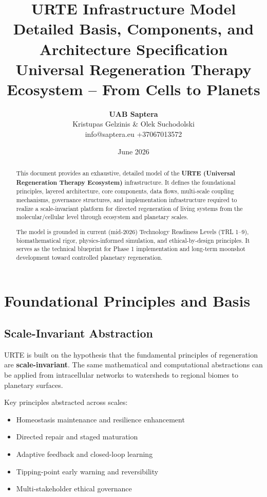 \documentclass[11pt,a4paper]{report}
\title{\textbf{URTE Infrastructure Model}\\[0.3cm]
\large Detailed Basis, Components, and Architecture Specification\\[0.2cm]
\normalsize Universal Regeneration Therapy Ecosystem -- From Cells to Planets}
\author{
\textbf{UAB Saptera} \\
Kristupas Gelzinis \& Olek Suchodolski \\
info@saptera.eu \quad +37067013572
}
\date{June 2026}
\begin{document}
\maketitle

\begin{abstract}
\noindent This document provides an exhaustive, detailed model of the \textbf{URTE (Universal Regeneration Therapy Ecosystem)} infrastructure. It defines the foundational principles, layered architecture, core components, data flows, multi-scale coupling mechanisms, governance structures, and implementation infrastructure required to realize a scale-invariant platform for directed regeneration of living systems from the molecular/cellular level through ecosystem and planetary scales.

The model is grounded in current (mid-2026) Technology Readiness Levels (TRL 1--9), biomathematical rigor, physics-informed simulation, and ethical-by-design principles. It serves as the technical blueprint for Phase 1 implementation and long-term moonshot development toward controlled planetary regeneration.
\end{abstract}

\tableofcontents
\newpage

\chapter{Foundational Principles and Basis}

\section{Scale-Invariant Abstraction}

URTE is built on the hypothesis that the fundamental principles of regeneration are \textbf{scale-invariant}. The same mathematical and computational abstractions can be applied from intracellular networks to watersheds to regional biomes to planetary surfaces.

Key principles abstracted across scales:
\begin{itemize}
    \item Homeostasis maintenance and resilience enhancement
    \item Directed repair and staged maturation
    \item Adaptive feedback and closed-loop learning
    \item Tipping-point early warning and reversibility
    \item Multi-stakeholder ethical governance
\end{itemize}
\end{document}
